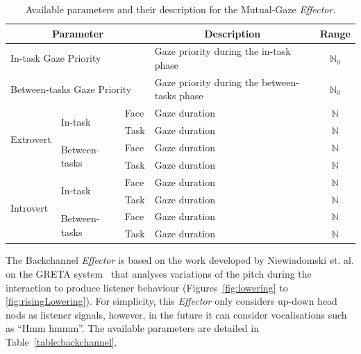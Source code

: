\begin{table}[H]
	\centering
	\begin{tabular}{|l|l|l|l|c|}
	\hline
	\multicolumn{3}{|c|}{\textbf{Parameter}} & \multicolumn{1}{c|}{\textbf{Description}} & \multicolumn{1}{c|}{\textbf{Range}} \\ \hline
	\multicolumn{3}{|l|}{In-task Gaze Priority} & Gaze priority during the in-task phase & $\mathbb{N}_0$ \\ \hline
	\multicolumn{3}{|l|}{Between-tasks Gaze Priority} & Gaze priority during the between-tasks phase & $\mathbb{N}_0$ \\ \hline
	\multirow{4}{*}{Extrovert} & \multirow{2}{*}{In-task} & Face & Gaze duration & $\mathbb{N}$ \\ \cline{3-5} 
	 &  & Task & Gaze duration & $\mathbb{N}$ \\ \cline{2-5} 
	 & \multirow{2}{*}{Between-tasks} & Face & Gaze duration & $\mathbb{N}$ \\ \cline{3-5} 
	 &  & Task & Gaze duration & $\mathbb{N}$ \\ \hline
	\multirow{4}{*}{Introvert} & \multirow{2}{*}{In-task} & Face & Gaze duration & $\mathbb{N}$ \\ \cline{3-5} 
	 &  & Task & Gaze duration & $\mathbb{N}$ \\ \cline{2-5} 
	 & \multirow{2}{*}{Between-tasks} & Face & Gaze duration & $\mathbb{N}$ \\ \cline{3-5} 
	 &  & Task & Gaze duration & $\mathbb{N}$ \\ \hline
	\end{tabular}
	\caption{Available parameters and their description for the Mutual-Gaze \textit{Effector}.}
	\label{table:mutualGazeParameters}
\end{table}

The Backchannel \textit{Effector} is based on the work developed by Niewiadomski et. al. on the GRETA system~\cite{Niewiadomski2009} that analyses variations of the pitch during the interaction to produce listener behaviour (Figures~\ref{fig:lowering} to \ref{fig:risingLowering}). For simplicity, this \textit{Effector} only considers up-down head nods as listener signals, however, in the future it can consider vocalisations such as ``Hmm hmmm''. The available parameters are detailed in Table~\ref{table:backchannel}.



